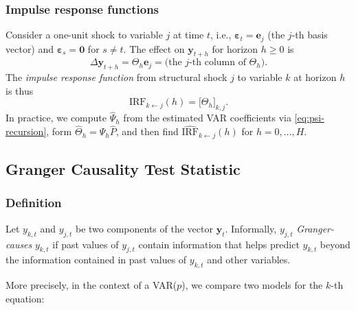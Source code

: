 \documentclass[11pt]{article}
\begin{document}
\subsubsection{Impulse response functions}

Consider a one-unit shock to variable $j$ at time $t$, i.e.,
$\boldsymbol{\varepsilon}_t = \mathbf{e}_j$ (the $j$-th basis
vector) and $\boldsymbol{\varepsilon}_s = \mathbf{0}$ for $s \neq t$.
The effect on $\mathbf{y}_{t+h}$ for horizon $h \ge 0$ is
\begin{equation}
  \Delta \mathbf{y}_{t+h}
  = \Theta_h \mathbf{e}_j
  = \text{(the $j$-th column of $\Theta_h$)}.
\end{equation}
The \emph{impulse response function} from structural shock $j$ to variable $k$
at horizon $h$ is thus
\begin{equation}
  \mathrm{IRF}_{k \leftarrow j}(h)
  = \big[ \Theta_h \big]_{k,j}.
  \label{eq:irf-entry}
\end{equation}
In practice, we compute $\widehat{\Psi}_h$ from the estimated VAR
coefficients via \cref{eq:psi-recursion}, form
$\widehat{\Theta}_h = \widehat{\Psi}_h \widehat{P}$, and then find
$\widehat{\mathrm{IRF}}_{k \leftarrow j}(h)$ for $h=0,\dots,H$.

\subsection{Granger Causality Test Statistic}
\label{app:granger}
\subsubsection{Definition}

Let $y_{k,t}$ and $y_{j,t}$ be two components of the vector
$\mathbf{y}_t$.
Informally, $y_{j,t}$ \emph{Granger-causes} $y_{k,t}$ if past values of
$y_{j,t}$ contain information that helps predict $y_{k,t}$ beyond the
information contained in past values of $y_{k,t}$ and other variables.

More precisely, in the context of a VAR($p$), we compare two models for
the $k$-th equation:
\end{document}
